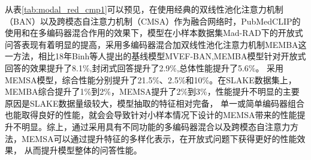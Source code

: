 从表\ref{tab:modal_red_cmp1}可以预见，在使用经典的双线性池化注意力机制（BAN）以及跨模态自注意力机制（CMSA）作为融合网络时，PubMedCLIP的使用和在多编码器混合作用的效果下，模型在小样本数据集Mad-RAD下的开放式
问答表现有着明显的提高，采用多编码器混合加双线性池化注意力机制MEMBA这一方法，相比18年Binh等人提出的基线模型MVEF-BAN\cite{nguyen2019overcoming},MEMBA模型针对开放式回答的效果提升了8.1\%,封闭式回答提升了2.9\%,总体性能提升了5.6\%。
采用MEMSA模型，综合性能分别提升了21.5\%、2.5\%和10\%。在SLAKE数据集上，MEMBA综合提升了1\%到2\%，MEMSA提升了2\%到3\%，性能提升不明显的主要原因是SLAKE数据量级较大，模型抽取的特征相对完备，
单一或简单编码器组合也能取得良好的性能，就会会导致针对小样本情况下设计的MEMSA带来的性能提升不明显。综上，通过采用具有不同功能的多编码器混合以及跨模态自注意力方法，MEMSA可以通过提升特征的多样化表示，在开放式问题下获得更好的性能效果，
从而提升模型整体的问答性能。
	
	

